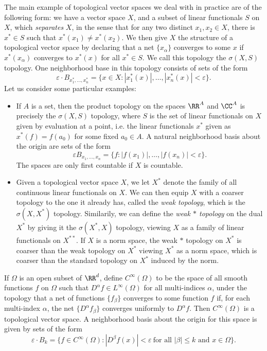 \begin{example}
    The main example of topological vector spaces we deal with in practice are of the following form: we have a vector space $X$, and a subset of linear functionals $S$ on $X$, which \emph{separates} $X$, in the sense that for any two distinct $x_1,x_2 \in X$, there is $x^* \in S$ such that $x^*(x_1) \neq x^*(x_2)$. We then give $X$ the structure of a topological vector space by declaring that a net $\{ x_\alpha \}$ converges to some $x$ if $x^*(x_\alpha)$ converges to $x^*(x)$ for all $x^* \in S$. We call this topology the $\sigma(X,S)$ topology. One neighborhood base in this topology consists of sets of the form
    \[ \varepsilon \cdot B_{x_1^*, \dots, x_n^*} = \{ x \in X: |x_1^*(x)|, \dots, |x_n^*(x)| < \varepsilon \}. \]
    Let us consider some particular examples:
    \begin{itemize}
        \item If $A$ is a set, then the product topology on the spaces $\RR^A$ and $\CC^A$ is precisely the $\sigma(X,S)$ topology, where $S$ is the set of linear functionals on $X$ given by evaluation at a point, i.e. the linear functionals $x^*$ given as $x^*(f) = f(a_0)$ for some fixed $a_0 \in A$. A natural neighborhood basis about the origin are sets of the form
        \[ \varepsilon B_{x_1,\dots,x_n} = \{ f : |f(x_1)|, \dots, |f(x_n)| < \varepsilon \}. \]
        The spaces are only first countable if $X$ is countable.

        \item Given a topological vector space $X$, we let $X^*$ denote the family of all continuous linear functionals on $X$. We can then equip $X$ with a coarser topology to the one it already has, called the \emph{weak topology}, which is the $\sigma(X,X^*)$ topology. Similarily, we can define the \emph{weak $*$ topology} on the dual $X^*$ by giving it the $\sigma(X^*,X)$ topology, viewing $X$ as a family of linear functionals on $X^{**}$. If $X$ is a norm space, the weak $*$ topology on $X^*$ is coarser than the weak topology on $X^*$ viewing $X^*$ as a norm space, which is coarser than the standard topology on $X^*$ induced by the norm.
    \end{itemize}
\end{example}

\begin{example}
    If $\Omega$ is an open subset of $\RR^d$, define $C^\infty(\Omega)$ to be the space of all smooth functions $f$ on $\Omega$ such that $D^\alpha f \in L^\infty(\Omega)$ for all multi-indices $\alpha$, under the topology that a net of functions $\{ f_\beta \}$ converges to some function $f$ if, for each multi-index $\alpha$, the net $\{ D^\alpha f_\beta \}$ converges uniformly to $D^\alpha f$. Then $C^\infty(\Omega)$ is a topological vector space. A neighborhood basis about the origin for this space is given by sets of the form
    \[ \varepsilon \cdot B_k = \{ f \in C^\infty(\Omega): |D^\beta f(x)| < \varepsilon\ \text{for all $|\beta| \leq k$ and $x \in \Omega$} \}. \]
\end{example}

